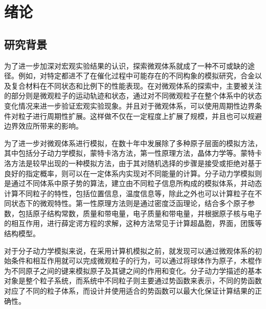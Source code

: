 
\chapter{绪论}

\section{研究背景}
为了进一步加深对宏观实验结果的认识，探索微观体系就成了一种不可或缺的途径。例如，对特定都进不了在催化过程中可能存在的不同构象的模拟研究，合金以及复合材料在不同状态和比例下的性能表现。在对微观体系的探索中，主要被关注的部分则是微观粒子的运动轨迹和状态，通过对不同微观粒子在整个体系中的状态变化情况来进一步验证宏观实验现象。并且对于微观体系，可以使用周期性边界条件对粒子进行周期性扩展。这样做不仅在一定程度上扩展了规模，并且也可以规避边界效应所带来的影响。

为了进一步对微观体系进行模拟，在数十年中发展除了多种原子层面的模拟方法，其中包括分子动力学模拟，蒙特卡洛方法\cite{raychaudhuri2008introduction,bird1981monte}，第一性原理方法\cite{warshel1976theoretical}，晶体力学等。蒙特卡洛方法是较早出现的一种模拟方法，由于其对随机选择的步骤是接受或拒绝对基于良好的指定概率，则可以在一定体系内实现对不同能量的计算。分子动力学模拟则是通过不同体系中原子势的算法，建立由不同粒子信息所构成的模拟体系，并动态计算不同粒子的特性，包括位置信息，温度信息等，除此之外也可以计算粒子在不同状态下的微观特性。第一性原理方法则是通过密度泛函理论，结合多个原子参数，包括原子结构常数，质量和带电量，电子质量和带电量，并根据原子核与电子的相互作用，进行薛定谔方程的求解，这种方法常见于计算超晶胞，界面，团簇等结构模型。

对于分子动力学模拟来说，在采用计算机模拟之前，就发现可以通过微观体系的初始条件和相互作用就可以完成微观粒子的行为，可以通过将球体作为原子，木棍作为不同原子之间的键来模拟原子及其键之间的作用和变化。分子动力学描述的基本对象是整个粒子系统，而系统中不同粒子则主要通过势函数来表示，不同的势函数对应了不同的粒子体系，而设计并使用适合的势函数可以最大化保证计算结果的正确性。

